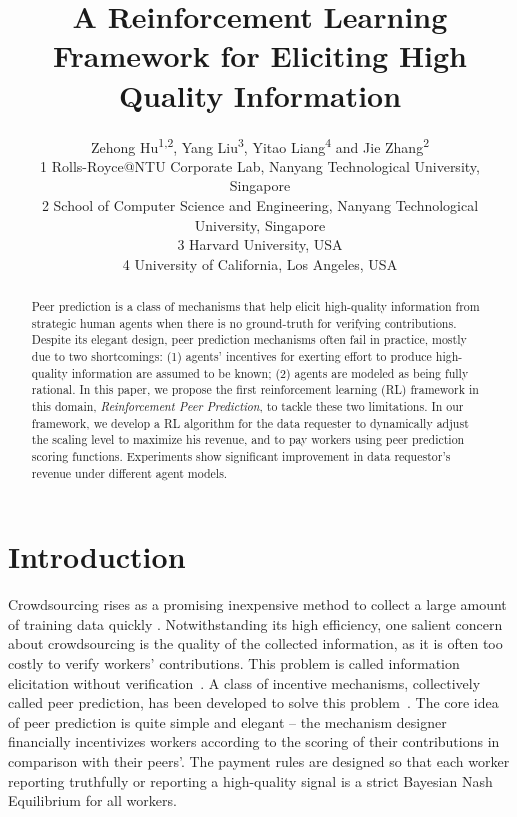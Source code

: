 \documentclass[letterpaper]{article} %
\begin{document}
%
\title{A Reinforcement Learning Framework for Eliciting High Quality Information}
\author{Zehong Hu\textsuperscript{1,2}, Yang Liu\textsuperscript{3}, Yitao Liang\textsuperscript{4} and Jie Zhang\textsuperscript{2}\\
1 Rolls-Royce@NTU Corporate Lab, Nanyang Technological University, Singapore\\
2 School of Computer Science and Engineering, Nanyang Technological University, Singapore \\
3 Harvard University, USA\\
4 University of California, Los Angeles, USA\\}
\maketitle
\begin{abstract}
Peer prediction is a class of mechanisms that help elicit high-quality information from strategic human agents when there is no ground-truth for verifying contributions. Despite its elegant design, peer prediction mechanisms often fail in practice, mostly due to two shortcomings: (1) agents' incentives for exerting effort to produce high-quality information are assumed to be known; (2) agents are modeled as being fully rational. In this paper, we propose the first reinforcement learning (RL) framework in this domain, \emph{Reinforcement Peer Prediction}, to tackle these two limitations. In our framework, we develop a RL algorithm for the data requester to dynamically adjust the scaling level to maximize his revenue, and to pay workers using peer prediction scoring functions. Experiments show significant improvement in data requestor's revenue under different agent models.
\end{abstract}

\section{Introduction}
Crowdsourcing rises as a promising inexpensive method to collect a large amount of training data quickly \cite{snow2008cheap,deng2009imagenet}.
Notwithstanding its high efficiency, one salient concern about crowdsourcing is the quality of the collected information, as it is often too costly to verify workers' contributions.
This problem is called information elicitation without verification~\cite{waggoner2014output}.
A class of incentive mechanisms, collectively called peer prediction, has been developed to solve this problem~\cite{miller2005eliciting,jurca2009mechanisms,witkowski2012robust,witkowski2012peer,radanovic2013robust}.
The core idea of peer prediction is quite simple and elegant -- the mechanism designer financially incentivizes
workers according to the scoring of their contributions in comparison with their peers'. The payment rules are designed so that each worker reporting truthfully or reporting a high-quality signal is a strict Bayesian Nash Equilibrium for all workers.
\end{document}
